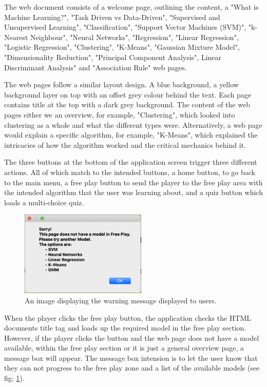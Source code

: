 		The web document consists of a welcome page, outlining the content, a "What is Machine Learning?", "Task Driven vs Data-Driven", "Supervised and Unsupervised Learning", "Classification", "Support Vector Machines (SVM)", "k-Nearest Neighbour", "Neural Networks", "Regression", "Linear Regression", "Logistic Regression", "Clustering", "K-Means", "Gaussian Mixture Model", "Dimensionality Reduction", "Principal Component Analysis", Linear Discriminant Analysis" and "Association Rule" web pages.
	
		The web pages follow a similar layout design. A blue background, a yellow background layer on top with an offset grey colour behind the text. Each page contains title at the top with a dark grey background. The content of the web pages either we an overview, for example, "Clustering", which looked into clustering as a whole and what the different types were. Alternatively, a web page would explain a specific algorithm, for example, "K-Means", which explained the intricacies of how the algorithm worked and the critical mechanics behind it.
	
		The three buttons at the bottom of the application screen trigger three different actions. All of which match to the intended buttons, a home button, to go back to the main menu, a free play button to send the player to the free play area with the intended algorithm that the user was learning about, and a quiz button which loads a multi-choice quiz.
	
	\begin{figure}[t]
		\begin{center}
			\includegraphics[width=6cm]{graphics/no_model_warning.png}
			\caption{An image displaying the warning message displayed to users.}
			\label{fig:no_model_warning}
		\end{center}
	\end{figure}
	
		When the player clicks the free play button, the application checks the HTML documents title tag and loads up the required model in the free play section. However, if the player clicks the button and the web page does not have a model available, within the free play section or it is just a general overview page, a message box will appear. The message box intension is to let the user know that they can not progress to the free play zone and a list of the available models (see fig: \ref{fig:no_model_warning}).
	
